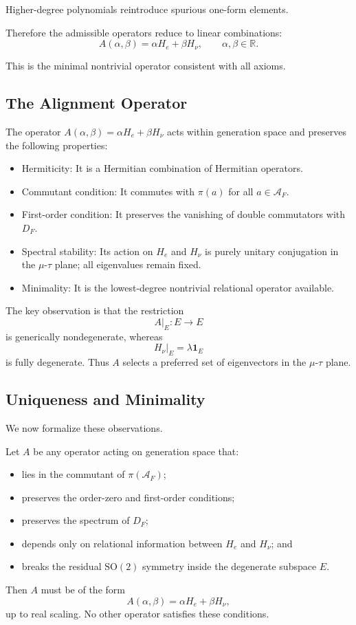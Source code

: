 Higher-degree polynomials reintroduce spurious one-form elements.

Therefore the admissible operators reduce to linear combinations:
\[
A(\alpha,\beta) = \alpha H_e + \beta H_\nu,\qquad \alpha,\beta \in \mathbb R.
\]

This is the minimal nontrivial operator consistent with all axioms.

\subsection{The Alignment Operator}

The operator $A(\alpha,\beta)=\alpha H_e + \beta H_\nu$ acts within generation space and preserves the following properties:
\begin{itemize}
\item Hermiticity: It is a Hermitian combination of Hermitian operators.
\item Commutant condition: It commutes with $\pi(a)$ for all $a\in\mathcal A_F$.
\item First-order condition: It preserves the vanishing of double commutators with $D_F$.
\item Spectral stability: Its action on $H_e$ and $H_\nu$ is purely unitary conjugation in the $\mu$-$\tau$ plane; all eigenvalues remain fixed.
\item Minimality: It is the lowest-degree nontrivial relational operator available.
\end{itemize}

The key observation is that the restriction
\[
A|_E : E \longrightarrow E
\]
is generically nondegenerate, whereas
\[
H_\nu|_E = \lambda \mathbf 1_E
\]
is fully degenerate.
Thus $A$ selects a preferred set of eigenvectors in the $\mu$-$\tau$ plane.

\subsection{Uniqueness and Minimality}\label{subsec:uniqueness-and-minimality}

We now formalize these observations.

\begin{theorem}
Let $A$ be any operator acting on generation space that:
\begin{itemize}
\item lies in the commutant of $\pi(\mathcal A_F)$;
\item preserves the order-zero and first-order conditions;
\item preserves the spectrum of $D_F$;
\item depends only on relational information between $H_e$ and $H_\nu$; and
\item breaks the residual $\mathrm{SO}(2)$ symmetry inside the degenerate subspace $E$.
\end{itemize}
Then $A$ must be of the form
\[
A(\alpha,\beta)=\alpha H_e+\beta H_\nu,
\]
up to real scaling. No other operator satisfies these conditions.
\end{theorem}

